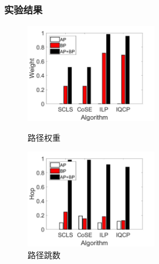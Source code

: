 \begin{frame}
\frametitle{实验结果}
\begin{figure}[htbp]
\centering
\begin{minipage}[t]{0.45\linewidth}
\centering
\includegraphics[width=2.25in]{figures/weight}
\caption{路径权重}
\label{fig:normalization weitgh sum}
\end{minipage}
\hfill
\begin{minipage}[t]{0.45\linewidth}
\centering
\includegraphics[width=2.25in]{figures/hop}
\caption{路径跳数}
\label{fig:normalization hop}
\end{minipage}
\end{figure}

\end{frame}






